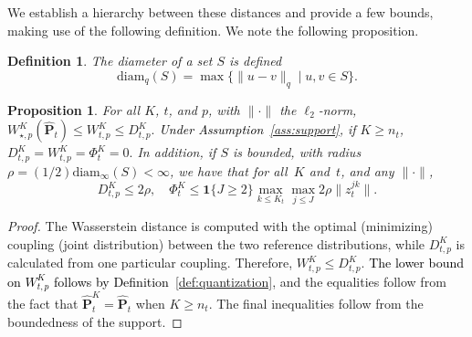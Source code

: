 \documentclass[12pt]{article}
\newcommand{\ones}{\mathbf 1}
\newcommand{\prob}{{\mathbf P}}
\newcommand{\supp}{S}
\newcommand{\barp}{p}
\newcommand{\ld}{W}
\newtheorem{proposition}{Proposition}[section]
\newtheorem{definition}{Definition}[section]
\newcommand{\RC}[1]{\textcolor{black}{#1}}
\newcommand{\RC}[1]{\textcolor{blue}{#1}}
\begin{document}
\ifpreprint We establish a hierarchy between these distances and provide a few bounds, making use of the following definition. \else 
We note the following proposition.
\fi 
\ifpreprint
\begin{definition}
    \label{def:diam_cluster}
    The diameter of a set $S$ is defined
    $$\mathrm{diam}_q(\supp) = \max\{\|u - v\|_q\mid u,v \in S\}.$$
\end{definition}
\fi
\begin{proposition}
\label{prop:values}
For all $K$, $t$, and $\barp$, with $\|\cdot\|$ the $\ell_2$-norm,
    $\ld^K_{\star,\barp}(\hat{\prob}_t) \leq  \ld^K_{t,\barp} \leq D^K_{t,\barp}.$ 
    \RC{Under Assumption~\ref{ass:support}}, if $K \geq n_t$,
$D^K_{t,\barp}=\ld^K_{t,\barp}=\Phi^K_t = 0.$
\ifpreprint
In addition, if $\supp$ is bounded, with radius $\rho = (1/2)\mathrm{diam}_\infty(\supp) < \infty$, we have that for all~$K$ and~$t$, and any $\|\cdot\|$,
    $$ D^K_{t,p} \leq 2\rho,  \quad \Phi^K_t \leq  \ones\{J\geq2\}\max_{k\leq {K_t}}\max_{j\leq J}2\rho\|z^{jk}_t\|.$$
    \fi
\end{proposition}
\begin{proof}
The Wasserstein distance is computed with the optimal (minimizing) coupling (joint distribution) between the two reference distributions, while $D^K_{t,\barp}$ is calculated from one particular coupling. Therefore, $\ld^K_{t,\barp} \leq D^K_{t,\barp}$. \RC{The lower bound on $ \ld^K_{t,\barp} $ follows by Definition~\ref{def:quantization}}, and the equalities follow from \ifpreprint the fact that \fi $\hat{\prob}^K_t = \hat{\prob}_t$ when $K\geq n_t$. \ifpreprint The final inequalities follow from the boundedness of the support. \fi
\end{proof}
\end{document}
